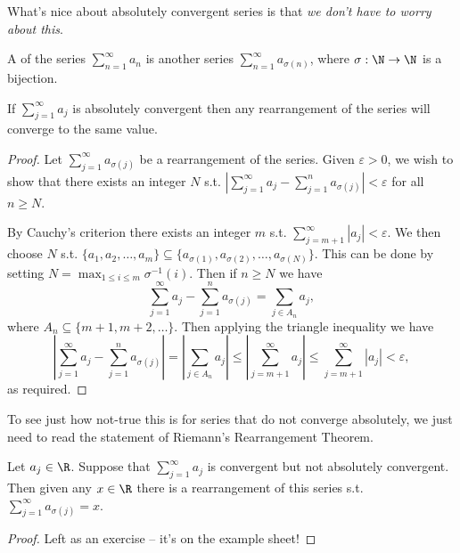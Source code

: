 What's nice about absolutely convergent series is that \emph{we don't have to worry about this}.

\begin{definition}[Rearrangement]
	A  of the series $\sum_{n = 1}^{\infty} a_n$ is another series $\sum_{n = 1}^{\infty} a_{\sigma(n)}$, where $\sigma : \N \rightarrow \N$ is a bijection.
\end{definition}

\begin{theorem}
	If $\sum_{j = 1}^{\infty} a_j$ is absolutely convergent then any rearrangement of the series will converge to the same value.
\end{theorem}
\begin{proof}
Let $\sum_{j = 1}^{\infty} a_{\sigma(j)}$ be a rearrangement of the series. Given $\varepsilon > 0$, we wish to show that there exists an integer $N$ s.t. $|\sum_{j = 1}^{\infty} a_j - \sum_{j = 1}^n a_{\sigma(j)}| < \varepsilon$ for all $n \geq N$.

By Cauchy's criterion there exists an integer $m$ s.t. $\sum_{j = m + 1}^{\infty} |a_j| < \varepsilon$.
We then choose $N$ s.t. $\{a_1, a_2, \dots, a_m\} \subseteq \{a_{\sigma(1)}, a_{\sigma(2)}, \dots, a_{\sigma(N)}\}$. This can be done by setting $N = \max_{1 \leq i \leq m} \sigma^{-1}(i)$.
Then if $n \geq N$ we have
$$
\sum_{j = 1}^{\infty} a_j - \sum_{j = 1}^n a_{\sigma(j)} = \sum_{j \in A_n} a_j,
$$
where $A_n \subseteq \{m + 1, m + 2, \dots \}$. 
Then applying the triangle inequality we have
$$
\left|\sum_{j = 1}^{\infty} a_j - \sum_{j = 1}^n a_{\sigma(j)}\right| = \left|\sum_{j \in A_n} a_j\right| \leq \left|\sum_{j = m + 1}^{\infty} a_j \right| \leq \sum_{j = m + 1}^{\infty} |a_j| < \varepsilon,
$$
as required.
\end{proof}

To see just how not-true this is for series that do not converge absolutely, we just need to read the statement of Riemann's Rearrangement Theorem.

\begin{theorem}
	Let $a_j \in \R$. Suppose that $\sum_{j = 1}^{\infty} a_j$ is convergent but not absolutely convergent. Then given any $x \in \R$ there is a rearrangement of this series s.t. $\sum_{j = 1}^{\infty} a_{\sigma(j)} = x$.
\end{theorem}
\begin{proof}
	Left as an exercise -- it's on the example sheet!
\end{proof}

\clearpage